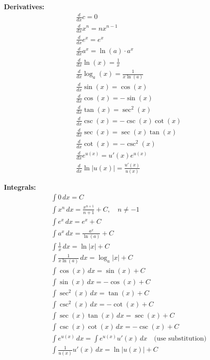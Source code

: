 \begin{multicols}{2}
\noindent
\textbf{Derivatives:}
\begin{align*}
&\frac{d}{dx}c = 0 \\
&\frac{d}{dx}x^n = nx^{n-1} \\
&\frac{d}{dx}e^x = e^x \\
&\frac{d}{dx}a^x = \ln(a) \cdot a^x \\
&\frac{d}{dx}\ln(x) = \frac{1}{x} \\
&\frac{d}{dx}\log_a(x) = \frac{1}{x \ln(a)} \\
&\frac{d}{dx}\sin(x) = \cos(x) \\
&\frac{d}{dx}\cos(x) = -\sin(x) \\
&\frac{d}{dx}\tan(x) = \sec^2(x) \\
&\frac{d}{dx}\csc(x) = -\csc(x)\cot(x) \\
&\frac{d}{dx}\sec(x) = \sec(x)\tan(x) \\
&\frac{d}{dx}\cot(x) = -\csc^2(x) \\
&\frac{d}{dx}e^{u(x)} = u'(x)e^{u(x)} \\
&\frac{d}{dx}\ln|u(x)| = \frac{u'(x)}{u(x)}
\end{align*}

\columnbreak

\noindent
\textbf{Integrals:}
\begin{align*}
&\int 0\,dx = C \\
&\int x^n\,dx = \frac{x^{n+1}}{n+1} + C, \quad n \neq -1 \\
&\int e^x\,dx = e^x + C \\
&\int a^x\,dx = \frac{a^x}{\ln(a)} + C \\
&\int \frac{1}{x}\,dx = \ln|x| + C \\
&\int \frac{1}{x \ln(a)}\,dx = \log_a|x| + C \\
&\int \cos(x)\,dx = \sin(x) + C \\
&\int \sin(x)\,dx = -\cos(x) + C \\
&\int \sec^2(x)\,dx = \tan(x) + C \\
&\int \csc^2(x)\,dx = -\cot(x) + C \\
&\int \sec(x)\tan(x)\,dx = \sec(x) + C \\
&\int \csc(x)\cot(x)\,dx = -\csc(x) + C \\
&\int e^{u(x)}\,dx = \int e^{u(x)}u'(x)\,dx \quad \text{(use substitution)} \\
&\int \frac{1}{u(x)}u'(x)\,dx = \ln|u(x)| + C
\end{align*}
\end{multicols}

